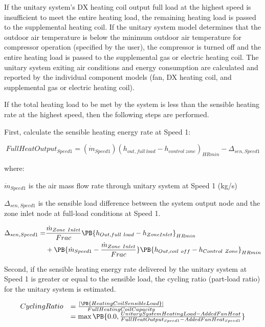 If the unitary system's DX heating coil output full load at the highest speed is insufficient to meet the entire heating load, the remaining heating load is passed to the supplemental heating coil. If the unitary system model determines that the outdoor air temperature is below the minimum outdoor air temperature for compressor operation (specified by the user), the compressor is turned off and the entire heating load is passed to the supplemental gas or electric heating coil. The unitary system exiting air conditions and energy consumption are calculated and reported by the individual component models (fan, DX heating coil, and supplemental gas or electric heating coil).

If the total heating load to be met by the system is less than the sensible heating rate at the highest speed, then the following steps are performed.

First, calculate the sensible heating energy rate at Speed 1:

\begin{equation}
FullHeatOutpu{t_{Speed1}} = ({\dot m_{Speed1}}){({h_{out,full~load}} - {h_{control~zone}})_{HRmin}} - {\Delta_{sen,Speed1}}
\end{equation}

where:

\({\dot m_{Speed1}}\) is the air mass flow rate through unitary system at Speed 1 (kg/s)

\(\Delta_{sen,Speed1}\) is the sensible load difference between the system output node and the zone inlet node at full-load conditions at Speed 1.

\begin{equation}
  \begin{split}
    \Delta_{sen,Speed1} =& \frac{\dot{m}_{Zone~Inlet}}{Frac} \PB{h_{Out,full~load} - h_{ZoneInlet}}_{HRmin} \\
                              &+ \PB{\dot{m}_{Speed1} - \frac{\dot{m}_{Zone~Inlet}}{Frac}} \PB{h_{Out,coil~off} - h_{Control~Zone}}_{HRmin}
  \end{split}
\end{equation}

Second, if the sensible heating energy rate delivered by the unitary system at Speed 1 is greater or equal to the sensible load, the cycling ratio (part-load ratio) for the unitary system is estimated.

\begin{equation}
  \begin{array}{rl}
    CyclingRatio &= \frac{\left|\PB{HeatingCoilSensibleLoad}\right|}{FullHeatingCoilCapacity} \\
                 &= \max \PB{0.0,\frac{UnitarySystemHeatingLoad - AddedFanHeat}{FullHeatOutput_{Speed1} - AddedFanHeat_{Speed1}}}
  \end{array}
\end{equation}

